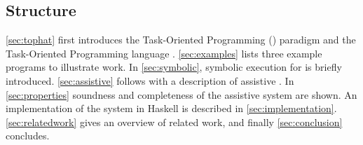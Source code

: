 \subsection{Structure}

\cref{sec:tophat} first introduces the Task-Oriented Programming (\TOP) paradigm and the Task-Oriented Programming language \TOPHAT.
\cref{sec:examples} lists three example programs to illustrate \TOPHAT work.
In \cref{sec:symbolic}, symbolic execution for \TOPHAT is briefly introduced.
\cref{sec:assistive} follows with a description of assistive \TOPHAT.
In \cref{sec:properties} soundness and completeness of the assistive system are shown.
An implementation of the system in Haskell is described in \cref{sec:implementation}.
\cref{sec:relatedwork} gives an overview of related work, and finally \cref{sec:conclusion} concludes.
